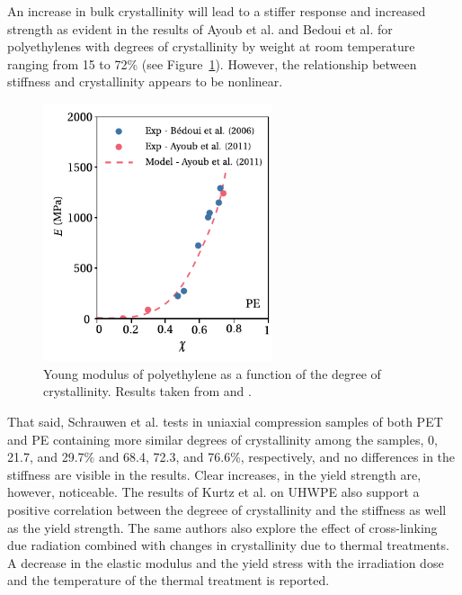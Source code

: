 An increase in bulk crystallinity will lead to a stiffer response and increased strength as evident in the results of Ayoub et al. \citep{ayoubEffectsCrystalContent2011} and Bedoui et al. \citep{bedouiMicromechanicalModelingIsotropic2006} for polyethylenes with degrees of crystallinity by weight at room temperature ranging from 15 to 72\% (see Figure~\ref{fig:deg_cryst_stiff}).
However, the relationship between stiffness and crystallinity appears to be nonlinear.
\begin{figure}
	\includegraphics[width=0.6\textwidth]{figures/deg_cryst_stiff}
  \caption{Young modulus of polyethylene as a function of the degree of crystallinity. Results taken from \cite{bedouiMicromechanicalModelingIsotropic2006} and \cite{ayoubModellingLargeDeformation2010}.}
\label{fig:deg_cryst_stiff}
\end{figure}
That said, Schrauwen et al. \citep{schrauwenIntrinsicDeformationBehavior2004} tests in uniaxial compression samples of both PET and PE containing more similar degrees of crystallinity among the samples, 0, 21.7, and 29.7\% and 68.4, 72.3, and 76.6\%, respectively, and no differences in the stiffness are visible in the results.
Clear increases, in the yield strength are, however, noticeable.
The results of Kurtz et al. \citep{kurtzThermomechanicalBehaviorVirgin2002} on UHWPE also support a positive correlation between the degreee of crystallinity and the stiffness as well as the yield strength.
The same authors \citep{kurtzMiniatureSpecimenMechanical1999, kurtzThermomechanicalBehaviorVirgin2002} also explore the effect of cross-linking due radiation combined with changes in crystallinity due to thermal treatments.
A decrease in the elastic modulus and the yield stress with the irradiation dose and the temperature of the thermal treatment is reported.

